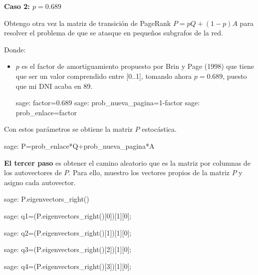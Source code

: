 \par\textbf{Caso 2: $p = 0.689$}
\par Obtengo otra vez la matriz de transición de PageRank $P=pQ + (1-p)A$ para resolver el 
problema de que se atasque en pequeños subgrafos de la red.
\par Donde:
\begin{itemize}
    \item $p$ es el factor de amortiguamiento propuesto por Brin y Page (1998) que tiene que ser un valor 
    comprendido entre [0..1], tomando ahora $p = 0.689$, puesto que mi DNI acaba en 89.
    \begin{sagecommandline}
        sage: factor=0.689
        sage: prob_nueva_pagina=1-factor
        sage: prob_enlace=factor
    \end{sagecommandline}
\end{itemize}


\par Con estos parámetros se obtiene la matriz $P$ estocástica.
\begin{sagecommandline}
    sage: P=prob_enlace*Q+prob_nueva_pagina*A
\end{sagecommandline}

\par \textbf{El tercer paso} es obtener el camino aleatorio que es la matriz por columnas de los autovectores de $P$.
Para ello, muestro los vectores propios de la matriz $P$ y asigno cada autovector.
\begin{sagecommandline}[\textwidth]
    sage: P.eigenvectors_right()
\end{sagecommandline}

  
\begin{sagecommandline}
    sage: q1=(P.eigenvectors_right()[0])[1][0];
\end{sagecommandline}

\begin{sagecommandline}
    sage: q2=(P.eigenvectors_right()[1])[1][0];
\end{sagecommandline}

\begin{sagecommandline}
    sage: q3=(P.eigenvectors_right()[2])[1][0];
\end{sagecommandline}

\begin{sagecommandline}
    sage: q4=(P.eigenvectors_right()[3])[1][0];
\end{sagecommandline}

